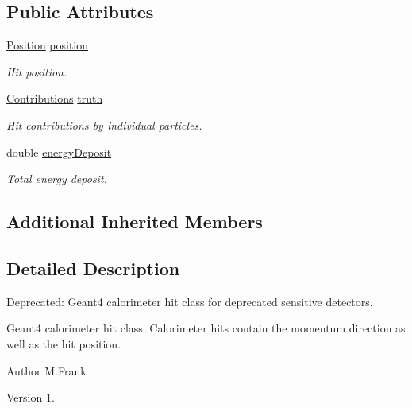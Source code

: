 \subsection*{Public Attributes}
\begin{DoxyCompactItemize}
\item 
\hyperlink{namespace_d_d4hep_1_1_geometry_a55083902099d03506c6db01b80404900}{Position} \hyperlink{class_d_d4hep_1_1_simulation_1_1_geant4_calorimeter_hit_a1e8c2c552a126d33cca2fbf15354309f}{position}
\begin{DoxyCompactList}\small\item\em Hit position. \end{DoxyCompactList}\item 
\hyperlink{class_d_d4hep_1_1_simulation_1_1_geant4_hit_acdc278ce7e641d337b024d5fc8f52a2c}{Contributions} \hyperlink{class_d_d4hep_1_1_simulation_1_1_geant4_calorimeter_hit_a2db0ef9e8d6cfd29213269ccc8d53256}{truth}
\begin{DoxyCompactList}\small\item\em Hit contributions by individual particles. \end{DoxyCompactList}\item 
double \hyperlink{class_d_d4hep_1_1_simulation_1_1_geant4_calorimeter_hit_ae597e191f120cea7585fec73ddae48e9}{energy\+Deposit}
\begin{DoxyCompactList}\small\item\em Total energy deposit. \end{DoxyCompactList}\end{DoxyCompactItemize}
\subsection*{Additional Inherited Members}


\subsection{Detailed Description}
Deprecated\+: Geant4 calorimeter hit class for deprecated sensitive detectors. 

Geant4 calorimeter hit class. Calorimeter hits contain the momentum direction as well as the hit position.

\begin{DoxyAuthor}{Author}
M.\+Frank 
\end{DoxyAuthor}
\begin{DoxyVersion}{Version}
1. 
\end{DoxyVersion}


